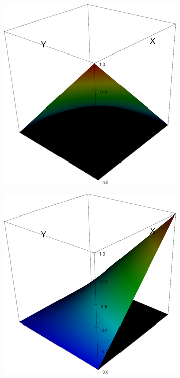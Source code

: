 \begin{frame}
\begin{figure}
\hfill{}
\begin{subfigure}{0.2\textwidth}
  \includegraphics[width=\textwidth]{addendum/figures/Q1_shape0000.png}
\end{subfigure}
\hfill{}
\begin{subfigure}{0.2\textwidth}
  \includegraphics[width=\textwidth]{addendum/figures/Q1_shape0001.png}

\end{subfigure}
\end{figure}
\end{frame}

